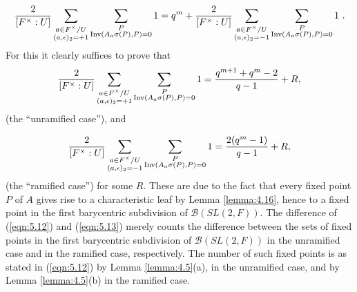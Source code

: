 \documentclass[12pt,letterpaper]{amsart}
\numberwithin{equation}{section}
\theoremstyle{definition}
\theoremstyle{plain}
\providecommand{\cal}{\mathcal}
\begin{document}
\begin{equation}
{2\over{[F^{\times}:U]}}
\sum_{\substack{ a\in F^{\times}/U\\ (a,\epsilon)_2 =+1}}
\sum_{\substack{ P\\ {\rm Inv}(A_a\sigma (P),P) = 0}} 1
= q^m + {2\over{[F^{\times}:U]}}
\sum_{\substack{ a\in F^{\times}/U\\ (a,\epsilon)_2=-1}}
\sum_{\substack{ P\\ {\rm Inv}(A_a\sigma (P),P) = 0}} 1\ .
\label{eqn:5.11}
\end{equation}
For this it clearly suffices to prove that
\begin{equation}
{2\over{[F^{\times}:U]}}
\sum_{\substack{ a\in F^{\times}/U\\ (a,\epsilon)_2 =+1 }}
\sum_{\substack{ P\\ {\rm Inv}(A_a\sigma (P),P) = 0 }} 1
={{q^{m+1}+q^m-2}\over{q-1}}+R,
\label{eqn:5.12}
\end{equation}
(the ``unramified case''), and

\begin{equation}
{2\over{[F^{\times}:U]}}
\sum_{\substack{ a\in F^{\times}/U\\ (a,\epsilon)_2 =-1 }}
\sum_{\substack{ P\\ {\rm Inv}(A_a\sigma (P),P) = 0 }} 1
={{2(q^m - 1)}\over{q-1}}+R,
\label{eqn:5.13}
\end{equation}
(the ``ramified case'') for some $R$. 
These are due to the fact that every fixed point $P$ of $A$ gives
rise to a characteristic leaf by Lemma \ref{lemma:4.16}, 
hence to a fixed point in the
first barycentric subdivision of ${\cal B}(SL(2,F))$. The difference
of (\ref{eqn:5.12}) and (\ref{eqn:5.13}) 
merely counts the difference between the
sets of fixed points in the 
first barycentric subdivision of ${\cal B}(SL(2,F))$ in the unramified case
and in the ramified case, respectively. 
The number of such fixed 
points is as stated in (\ref{eqn:5.12}) by 
Lemma \ref{lemma:4.5}(a), in the unramified
case, and by Lemma \ref{lemma:4.5}(b) in the ramified case.
 
\end{document}
